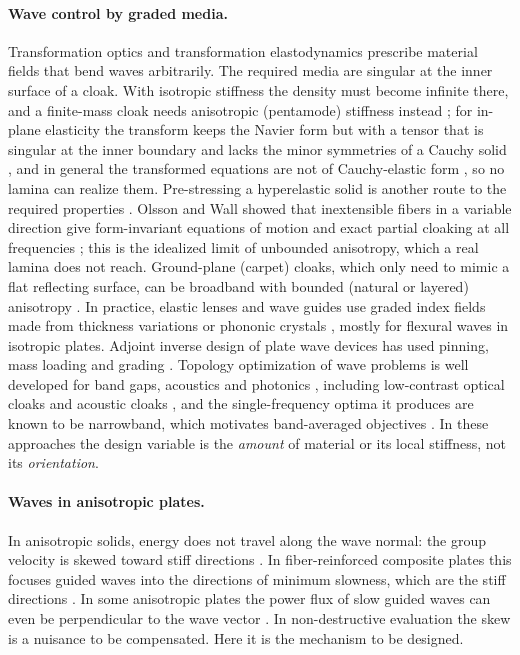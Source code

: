 \paragraph{Wave control by graded media.} Transformation optics \cite{pendry2006} and
transformation elastodynamics \cite{milton2006,norris2008,brun2009,norrisshuvalov2011} prescribe material
fields that bend waves arbitrarily. The required media are singular at the inner
surface of a cloak. With isotropic stiffness the density must become infinite there, and a
finite-mass cloak needs anisotropic (pentamode) stiffness instead \cite{norris2008}; for
in-plane elasticity the transform keeps the Navier form but with a tensor that is singular
at the inner boundary and lacks the minor symmetries of a Cauchy solid
\cite{brun2009,norrisshuvalov2011}, and in general the transformed equations are not of
Cauchy-elastic form \cite{milton2006}, so no lamina can realize them. Pre-stressing a
hyperelastic solid is another route to the required properties
\cite{parnell2012,norrisparnell2012}. Olsson and Wall showed that inextensible
fibers in a variable direction give form-invariant equations of motion and exact partial
cloaking at all frequencies \cite{olsson2011}; this is the idealized limit of unbounded
anisotropy, which a real lamina does not reach. Ground-plane (carpet) cloaks, which only
need to mimic a flat reflecting surface, can be broadband with bounded (natural or layered) anisotropy
\cite{chen2011,popa2011}. In practice, elastic lenses and wave guides
use graded index fields made from thickness variations \cite{climente2014} or
phononic crystals \cite{tol2017}, mostly for flexural waves in isotropic plates. Adjoint
inverse design of plate wave devices has used pinning, mass loading and grading
\cite{capers2023}. Topology optimization of wave problems is well developed for band
gaps, acoustics and photonics \cite{sigmund2003,duhring2008,jensen2011}, including
low-contrast optical cloaks \cite{andkjaer2011} and acoustic cloaks \cite{andkjaer2013}, and the
single-frequency optima it produces are known to be narrowband, which motivates
band-averaged objectives \cite{jensen2005,andkjaer2013}. In these approaches the design variable is the
\emph{amount} of material or its local stiffness, not its \emph{orientation}.

\paragraph{Waves in anisotropic plates.} In anisotropic solids, energy does not travel
along the wave normal: the group velocity is skewed toward stiff directions
\cite{auld,rose2014}. In fiber-reinforced composite plates this focuses guided waves into the directions of
minimum slowness, which are the stiff directions \cite{chapuis2010}. In some anisotropic plates the power flux of slow guided waves can even
be perpendicular to the wave vector \cite{kiefer2023}. In non-destructive evaluation the skew
is a nuisance to be compensated. Here it is the mechanism to be designed.

